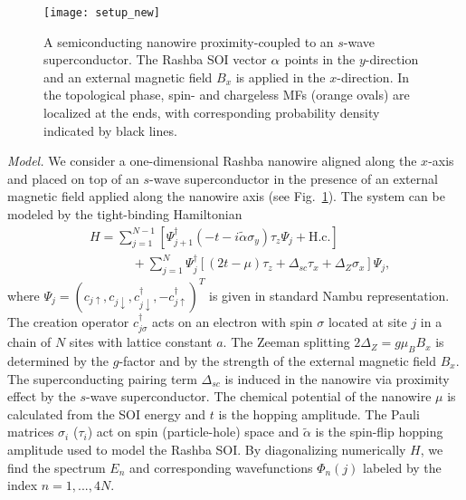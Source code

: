\documentclass[prl,twocolumn,showpacs,floatfix,amsbsy,amsbsy,superscriptaddress]{revtex4-1}
\begin{document}
\begin{figure}[t]
\texttt{[image: setup\_new]}
\caption{A semiconducting nanowire proximity-coupled to an $s$-wave superconductor.  The Rashba SOI vector ${\bf \alpha}$ points in the $y$-direction and an external magnetic field ${ B_x}$ is applied in the $x$-direction. 
In the topological phase, spin- and chargeless MFs (orange ovals) are localized at the ends, with corresponding probability density 
indicated by black lines.
}
 \label{fig:Setup}
\end{figure}


{\it Model.} We consider a one-dimensional Rashba nanowire aligned along the $x$-axis and placed on top of an $s$-wave superconductor in the presence of an external magnetic field applied along the nanowire axis (see Fig.~\ref{fig:Setup}). The system can be modeled by the tight-binding Hamiltonian
\begin{align}
   &{H}=\sum_{j=1}^{N-1}[{\Psi}_{j+1}^\dag(-t-i\tilde{\alpha}\sigma_y)\tau_z{\Psi}_j+{\text {H.c.}}]\nonumber\\
	  &\hspace{40pt}+\sum_{j=1}^N{\Psi}_j^\dag[(2t-{\mu})\tau_z+\Delta_{sc}\tau_x+\Delta_{Z}\sigma_x]{\Psi}_j \label{hamiltonian_position},
\end{align}
where ${\Psi}_j=({c}_{j \uparrow}, {c}_{j \downarrow}, {{c}^{\dag}_{j \downarrow}}, {-{c}^{\dag}_{j \uparrow}})^T$ is given in standard Nambu representation.  The creation operator ${c}^{\dag}_{j \sigma} $ acts on an electron with spin $\sigma$ located at site $j$ in a chain of $N$ sites with lattice constant $a$.
 The Zeeman splitting 
 $2\Delta_Z=g\mu_B B_x$ is determined by the $g$-factor and by the strength of the external magnetic field $B_x$.  The superconducting pairing term  $\Delta_{sc}$ is induced in the nanowire via proximity effect by the $s$-wave superconductor.  The chemical potential of the nanowire $\mu$ is calculated from the SOI energy  and  $t$ is the hopping amplitude. The Pauli matrices $\sigma_i$ ($\tau_i$) act on spin (particle-hole) space and $\tilde{\alpha}$ is the spin-flip hopping amplitude used to model the Rashba SOI. By diagonalizing numerically ${H}$, we find the spectrum $E_n$ and corresponding wavefunctions $\Phi_n (j)$ labeled by the index $n=1,...,4N$.
 
\end{document}
